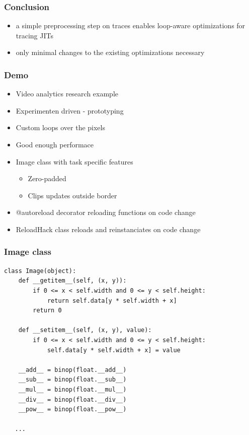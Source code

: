 \documentclass[utf8x]{beamer}
\begin{document}
\begin{frame}
  \frametitle{Conclusion}
  \begin{itemize}
      \item a simple preprocessing step on traces enables loop-aware optimizations for tracing JITs
      \item only minimal changes to the existing optimizations necessary
  \end{itemize}
\end{frame}



\begin{frame}
  \frametitle{Demo}
  \vfill
  \begin{itemize}
      \item Video analytics research example
      \item Experimenten driven - prototyping
      \item Custom loops over the pixels
      \item Good enough performace
  \end{itemize}
  \vfill
  \begin{itemize}
      \item Image class with task specific features
        \begin{itemize}
            \item Zero-padded
            \item Clips updates outside border
        \end{itemize}
      \item @autoreload decorator reloading functions on code change
      \item ReloadHack class reloads and reinstanciates on code change
  \end{itemize}
  \vfill
\end{frame}

\begin{frame}[fragile]
  \frametitle{Image class}
\begin{lstlisting}[mathescape,basicstyle=\setstretch{1.05}\ttfamily\scriptsize]
class Image(object):
    def __getitem__(self, (x, y)):
        if 0 <= x < self.width and 0 <= y < self.height:
            return self.data[y * self.width + x]
        return 0

    def __setitem__(self, (x, y), value):
        if 0 <= x < self.width and 0 <= y < self.height:
            self.data[y * self.width + x] = value

    __add__ = binop(float.__add__)
    __sub__ = binop(float.__sub__)
    __mul__ = binop(float.__mul__)
    __div__ = binop(float.__div__)
    __pow__ = binop(float.__pow__)

   ...
\end{lstlisting}
\end{frame}
\end{document}
